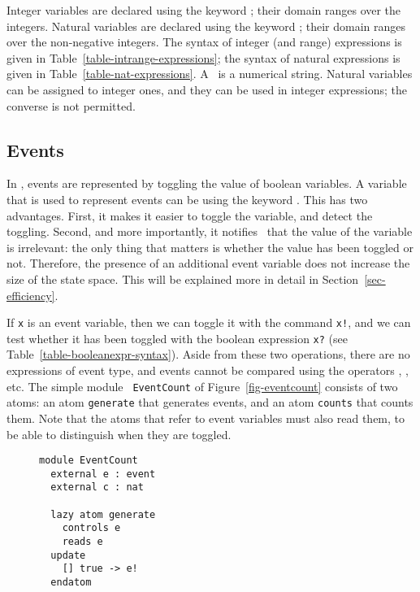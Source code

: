 {Integer variables are declared using the keyword
\INT; their domain ranges over the
integers.  Natural variables are declared using the keyword
\NAT; their domain ranges over the
non-negative integers.  The syntax of integer (and range) expressions
is given in Table~\ref{table-intrange-expressions}; the syntax of
natural expressions is given in Table~\ref{table-nat-expressions}.
A \const\ is a numerical string.
Natural variables can be assigned to integer ones, and they can be
used in integer expressions; the converse is not permitted. 


\subsection{Events}
\label{sec-eventvars}

In \mocha, events are represented by toggling the value of boolean
variables.  A variable that is used to represent events can be
using the keyword \EVENT{}.
This has two advantages.
First, it makes it easier to toggle the variable, and detect the
toggling.  Second, and more importantly, it notifies \mocha\ that the
value of the variable is irrelevant: the only thing that matters is
whether the value has been toggled or not.  Therefore, the presence of
an additional event variable does not increase the size of the state
space.  This will be explained more in detail in
Section~\ref{sec-efficiency}. 

If {\tt x} is an event variable, then we can toggle it with the
command {\tt x!}, and we can test whether it has been
toggled with the boolean expression {\tt x?} (see
Table~\ref{table-booleanexpr-syntax}).  Aside from these two
operations, there are no expressions of event type, and events cannot
be compared using the operators \LT, \GT, etc.  The simple module {\tt
EventCount} of Figure~\ref{fig-eventcount} consists of two atoms: an
atom {\tt generate} that generates events, and an atom {\tt counts}
that counts them. Note that the atoms that refer to event variables
must also read them, to be able to distinguish when they are toggled.

\begin{figure}
\begin{verbatim}
module EventCount
  external e : event
  external c : nat

  lazy atom generate
    controls e
    reads e
  update
    [] true -> e!
  endatom


\end{verbatim}
\end{figure}}
